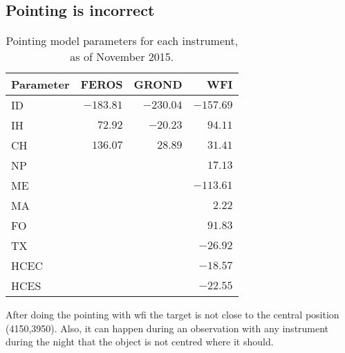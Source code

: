 \documentclass[11pt,fleqn]{book} %
\begin{document}
\subsection{Pointing is incorrect}
\label{sec:trouble:pointing}
\begin{table}[!bt]
\centering
\caption{Pointing model parameters for each instrument, as of November 2015.}
\label{tab:pointingmodelcoeff}
\small
\begin{tabular}{lrrr}
\hline\hline
Parameter & FEROS      & GROND     & WFI\\\hline
ID        & $-183.81$  & $-230.04$ & $-157.69$\\
IH        & $  72.92$  & $ -20.23$ & $  94.11$\\
CH        & $ 136.07$  & $  28.89$ & $  31.41$\\\hline
NP        & \multicolumn{3}{r}{$17.13$}\\
ME        & \multicolumn{3}{r}{$-113.61$}\\
MA        & \multicolumn{3}{r}{$2.22$}\\
FO        & \multicolumn{3}{r}{$91.83$}\\
TX        & \multicolumn{3}{r}{$-26.92$}\\
HCEC      & \multicolumn{3}{r}{$-18.57$}\\
HCES      & \multicolumn{3}{r}{$-22.55$}\\\hline
\end{tabular}
\end{table}

After doing the pointing with \gls{wfi} the target is not close to the central position (4150,3950).  Also, it can happen during an observation with any instrument during the night that the object is not centred where it should.
\end{document}

